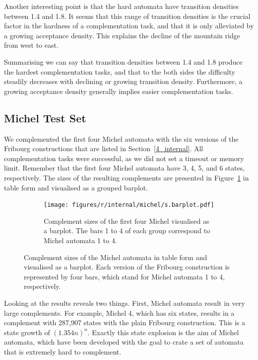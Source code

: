 Another interesting point is that the hard automata have transition densities between 1.4 and 1.8. It seems that this range of transition densities is the crucial factor in the hardness of a complementation task, and that it is only alleviated by a growing acceptance density. This explains the decline of the mountain ridge from west to east.

Summarising we can say that transition densities between 1.4 and 1.8 produce the hardest complementation tasks, and that to the both sides the difficulty steadily decreases with declining or growing transition density. Furthermore, a growing acceptance density generally implies easier complementation tasks.


\subsection{Michel Test Set}
We complemented the first four Michel automata with the six versions of the Fribourg constructions that are listed in Section~\ref{4_internal}. All complementation tasks were successful, as we did not set a timeout or memory limit. Remember that the first four Michel automata have 3, 4, 5, and 6 states, respectively. The sizes of the resulting complements are presented in Figure~\ref{i.m.states} in table form and visualised as a grouped barplot.

\begin{figure}[ht]
  \centering
  \begin{subtable}{0.75\textwidth}
    \centering
    
  \end{subtable}

  \begin{subfigure}{0.7\textwidth}
    \centering
    \texttt{[image: figures/r/internal/michel/s.barplot.pdf]}
    \caption{Complement sizes of the first four Michel visualised as a barplot. The bars 1 to 4 of each group correspond to Michel automata 1 to 4.}
  \end{subfigure}
\caption{Complement sizes of the Michel automata in table form and visualised as a barplot. Each version of the Fribourg construction is represented by four bars, which stand for Michel automata 1 to 4, respectively.}
\label{i.m.states}
\end{figure}

Looking at the results reveals two things. First, Michel automata result in very large complements. For example, Michel 4, which has six states, results in a complement with 287,907 states with the plain Fribourg construction. This is a state growth of $(1.354n)^n$. Exactly this state explosion is the aim of Michel automata, which have been developed with the goal to crate a set of automata that is extremely hard to complement.

